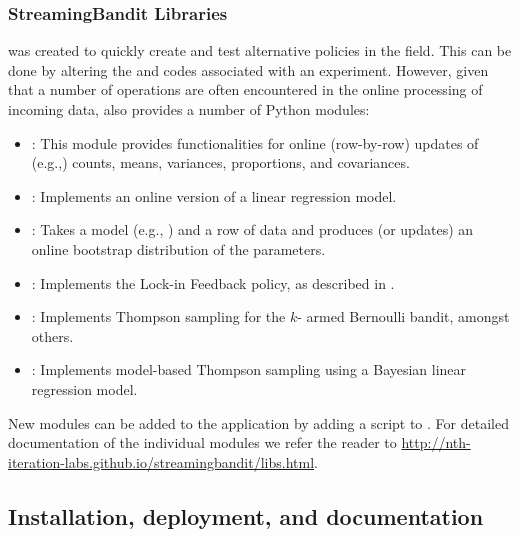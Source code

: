 \documentclass[nojss]{jss}
\begin{document}
\subsubsection{StreamingBandit Libraries}
 was created to quickly create and test alternative policies in the field. This can be done by altering the  and  codes associated with an experiment. However, given that a number of operations are often encountered in the online processing of incoming data,  also provides a number of Python modules:
\begin{itemize}
\item {}: This module provides functionalities for online (row-by-row) updates of (e.g.,) counts, means, variances, proportions, and covariances.
\item {}: Implements an online version of a linear regression model.
\item {}: Takes a model (e.g., ) and a row of data and produces (or updates) an online bootstrap distribution of the parameters.
\item {}: Implements the Lock-in Feedback policy, as described in \citep{Kaptein2014d}.
\item {}: Implements Thompson sampling for the $k$- armed Bernoulli bandit, amongst others.
\item {}: Implements model-based Thompson sampling using a Bayesian linear regression model.
\end{itemize}
New modules can be added to the application by adding a script to . For detailed documentation of the individual modules we refer the reader to \url{http://nth-iteration-labs.github.io/streamingbandit/libs.html}.

\subsection{Installation, deployment, and documentation}
\end{document}

